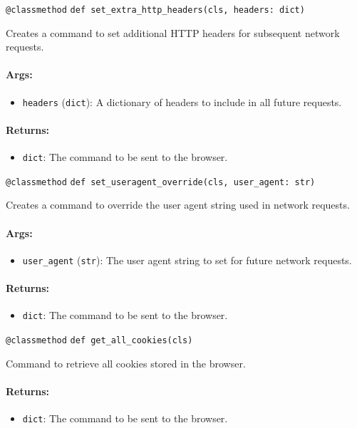 \documentclass{article}
\begin{document}
\noindent\texttt{@classmethod}
\noindent\texttt{def set\_extra\_http\_headers(cls, headers: dict)}

\noindent Creates a command to set additional HTTP headers for subsequent network requests.

\paragraph{Args:}
\begin{itemize}
    \item \texttt{headers} (\texttt{dict}): A dictionary of headers to include in all future requests.
\end{itemize}

\paragraph{Returns:}
\begin{itemize}
    \item \texttt{dict}: The command to be sent to the browser.
\end{itemize}

\noindent\texttt{@classmethod}
\noindent\texttt{def set\_useragent\_override(cls, user\_agent: str)}

\noindent Creates a command to override the user agent string used in network requests.

\paragraph{Args:}
\begin{itemize}
    \item \texttt{user\_agent} (\texttt{str}): The user agent string to set for future network requests.
\end{itemize}

\paragraph{Returns:}
\begin{itemize}
    \item \texttt{dict}: The command to be sent to the browser.
\end{itemize}

\noindent\texttt{@classmethod}
\noindent\texttt{def get\_all\_cookies(cls)}

\noindent Command to retrieve all cookies stored in the browser.

\paragraph{Returns:}
\begin{itemize}
    \item \texttt{dict}: The command to be sent to the browser.
\end{itemize}
\end{document}
